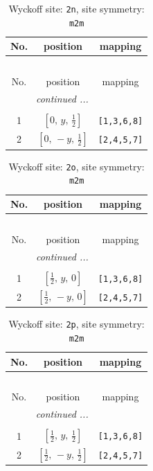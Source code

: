 \documentclass[fleqn,8pt]{jsarticle}
\begin{document}
\begin{longtable}{ccc}
\caption{Wyckoff site: {\tt 2n}, site symmetry: {\tt m2m}}
 \\
 \hline \hline
No. & position & mapping \\ \hline \endfirsthead

\multicolumn{2}{l}{\tablename\ \thetable{}} \\
 \hline \hline
No. & position & mapping \\ \hline \endhead

 \hline \hline
\multicolumn{2}{r}{\footnotesize\it continued ...} \\ \endfoot

 \hline \hline
\multicolumn{2}{r}{} \\ \endlastfoot

1 & $\left[ 0,\, y,\, \frac{1}{2} \right]$ & {\tt [1,3,6,8]} \\ \hline
2 & $\left[ 0,\, - y,\, \frac{1}{2} \right]$ & {\tt [2,4,5,7]} \\
\end{longtable}
\renewcommand{\arraystretch}{1.2}
\begin{longtable}{ccc}
\caption{Wyckoff site: {\tt 2o}, site symmetry: {\tt m2m}}
 \\
 \hline \hline
No. & position & mapping \\ \hline \endfirsthead

\multicolumn{2}{l}{\tablename\ \thetable{}} \\
 \hline \hline
No. & position & mapping \\ \hline \endhead

 \hline \hline
\multicolumn{2}{r}{\footnotesize\it continued ...} \\ \endfoot

 \hline \hline
\multicolumn{2}{r}{} \\ \endlastfoot

1 & $\left[ \frac{1}{2},\, y,\, 0 \right]$ & {\tt [1,3,6,8]} \\ \hline
2 & $\left[ \frac{1}{2},\, - y,\, 0 \right]$ & {\tt [2,4,5,7]} \\
\end{longtable}
\renewcommand{\arraystretch}{1.2}
\begin{longtable}{ccc}
\caption{Wyckoff site: {\tt 2p}, site symmetry: {\tt m2m}}
 \\
 \hline \hline
No. & position & mapping \\ \hline \endfirsthead

\multicolumn{2}{l}{\tablename\ \thetable{}} \\
 \hline \hline
No. & position & mapping \\ \hline \endhead

 \hline \hline
\multicolumn{2}{r}{\footnotesize\it continued ...} \\ \endfoot

 \hline \hline
\multicolumn{2}{r}{} \\ \endlastfoot

1 & $\left[ \frac{1}{2},\, y,\, \frac{1}{2} \right]$ & {\tt [1,3,6,8]} \\ \hline
2 & $\left[ \frac{1}{2},\, - y,\, \frac{1}{2} \right]$ & {\tt [2,4,5,7]} \\
\end{longtable}
\end{document}
